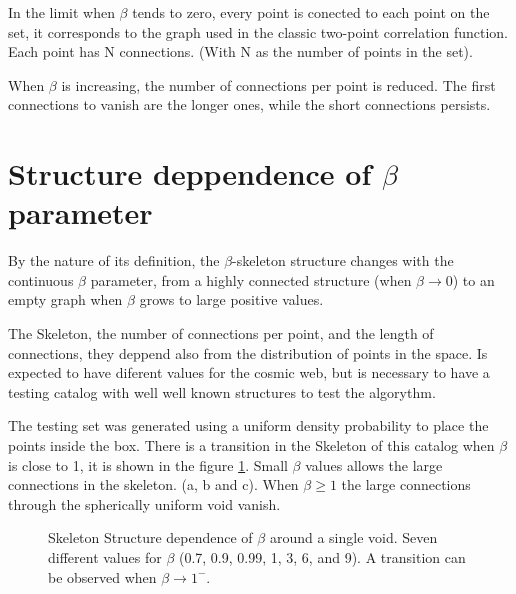 \documentclass[preprint]{aastex62}
\begin{document}
In the limit when $\beta$ tends to zero, every point is conected
to each point on the set, it corresponds to the graph used in
the classic two-point correlation function. Each point has N
connections. (With N as the number of points in the set).

When $\beta$ is increasing, the number of connections per point
is reduced. The first connections to vanish are the longer ones,
while the short connections persists.

\section{Structure deppendence of $\beta$ parameter}

By the nature of its definition, the $\beta$-skeleton structure
changes with the continuous $\beta$ parameter, from a highly connected
structure (when $\beta \rightarrow 0$) to an empty graph when $\beta$ 
grows to large positive values. 

The Skeleton, the number of connections per point, and the length of
connections, they deppend also from the distribution of points in the
space. Is expected to have diferent values for the cosmic web, but is
necessary to have a testing catalog with well well known structures
to test the algorythm.

The testing set was generated using a uniform density probability to place
the points inside the box. There is a transition in the Skeleton of this
catalog when $\beta$ is close to 1, it is shown in the figure
\ref{beta_graphs}. Small $\beta$ values allows the large
connections in the skeleton. (a, b and c). When $\beta \geq 1$ the large
connections through the spherically uniform void vanish.

\begin{figure}
  \caption{\label{beta_graphs}
    Skeleton Structure dependence of $\beta$ around
    a single void. Seven different values for $\beta$ (0.7, 0.9, 0.99, 1, 3, 6,
    and 9). A transition can be observed when $\beta \rightarrow 1^-$. }
\end{figure}
\end{document}
